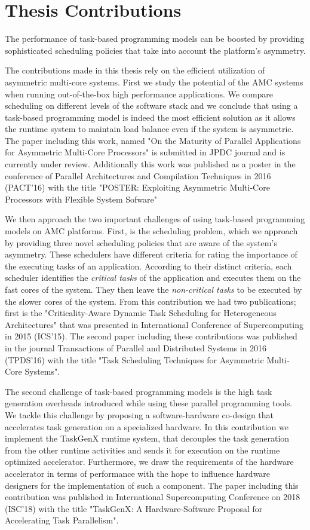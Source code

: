 \section{Thesis Contributions}

The performance of task-based programming models can be boosted by providing sophisticated scheduling policies that take into account the platform's asymmetry.

The contributions made in this thesis rely on the efficient utilization of asymmetric multi-core systems.
First we study the potential of the AMC systems when running out-of-the-box high performance applications.
We compare scheduling on different levels of the software stack and we conclude that using a task-based programming model is indeed the most efficient solution as it allows the runtime system to maintain load balance even if the system is asymmetric.
The paper including this work, named "On the Maturity of Parallel Applications for Asymmetric Multi-Core Processors" is submitted in JPDC journal and is currently under review.
Additionally this work was published as a poster in the conference of Parallel Architectures and Compilation Techniques in 2016 (PACT'16) with the title "POSTER: Exploiting Asymmetric Multi-Core Processors with Flexible System Sofware"

We then approach the two important challenges of using task-based programming models on AMC platforms.
First, is the scheduling problem, which we approach by providing three novel scheduling policies that are aware of the system's asymmetry.
These schedulers have different criteria for rating the importance of the executing tasks of an application.
According to their distinct criteria, each scheduler identifies the \textit{critical tasks} of the application and executes them on the fast cores of the system. 
They then leave the \textit{non-critical tasks} to be executed by the slower cores of the system.
From this contribution we had two publications; first is the "Criticality-Aware Dynamic Task Scheduling for Heterogeneous Architectures" that was presented in International Conference of Supercomputing in 2015 (ICS'15).
The second paper including these contributions was published in the journal Transactions of Parallel and Distributed Systems in 2016 (TPDS'16) with the title "Task Scheduling Techniques for Asymmetric Multi-Core Systems".

The second challenge of task-based programming models is the high task generation overheads introduced while using these parallel programming tools.
We tackle this challenge by proposing a software-hardware co-design that accelerates task generation on a specialized hardware.
In this contribution we implement the TaskGenX runtime system, that decouples the task generation from the other runtime activities and sends it for execution on the runtime optimized accelerator.
Furthermore, we draw the requirements of the hardware accelerator in terms of performance with the hope to influence hardware designers for the implementation of such a component.
The paper including this contribution was published in International Supercomputing Conference on 2018 (ISC'18) with the title "TaskGenX: A Hardware-Software Proposal for Accelerating Task Parallelism".

